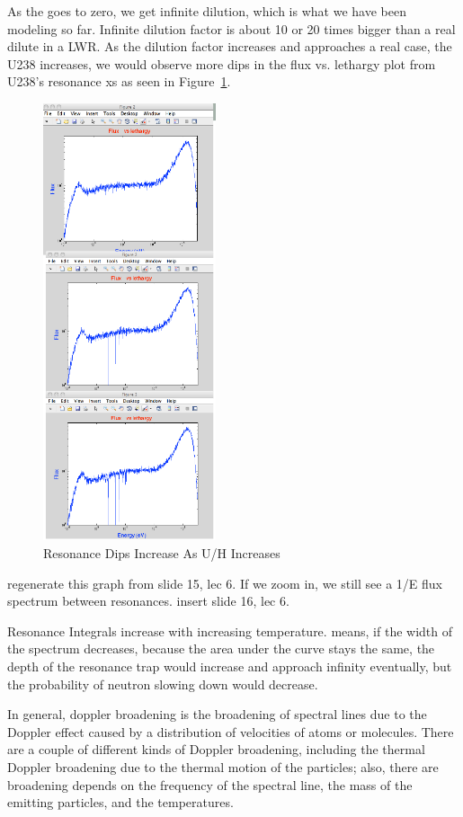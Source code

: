 \documentclass{school-22.211-notes}
\begin{document}
As the  goes to zero, we get infinite dilution, which is what we have been modeling so far. Infinite dilution factor is about 10 or 20 times bigger than a real dilute in a LWR. As the dilution factor increases and approaches a real case, the U238 increases, we would observe more dips in the flux vs. lethargy plot from U238's resonance xs as seen in Figure~\ref{dilution-factor-increase}. 
\begin{figure}
  \centering
  \includegraphics[width=2in]{images/dilution-factor-increase.png}
  \caption{Resonance Dips Increase As U/H Increases} \label{dilution-factor-increase}
\end{figure}
regenerate this graph from slide 15, lec 6. If we zoom in, we still see a 1/E flux spectrum between resonances. insert slide 16, lec 6. 

Resonance Integrals increase with increasing temperature.  means, if the width of the spectrum decreases, because the area under the curve stays the same, the depth of the resonance trap would increase and approach infinity eventually, but the probability of neutron slowing down would decrease. 

In general, doppler broadening is the broadening of spectral lines due to the Doppler effect caused by a distribution of velocities of atoms or molecules. There are a couple of different kinds of Doppler broadening, including the thermal Doppler broadening due to the thermal motion of the particles; also, there are broadening depends on the frequency of the spectral line, the mass of the emitting particles, and the temperatures. 
\end{document}
